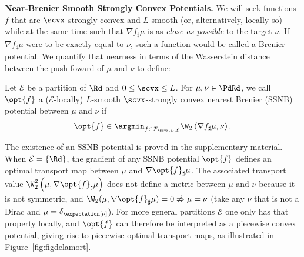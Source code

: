 \textbf{Near-Brenier Smooth Strongly Convex Potentials.}
We will seek functions $f$ that are $\scvx$-strongly convex and $L$-smooth (or, alternatively, locally so) while at the same time such that $\nabla f_\sharp \mu$ is as \textit{close as possible} to the target $\nu$. If $\nabla f_\sharp \mu$ were to be exactly equal to $\nu$, such a function would be called a Brenier potential. We quantify that nearness in terms of the Wasserstein distance between the push-foward of $\mu$ and $\nu$ to define:

\begin{definition} \label{def:SSNB}
    Let $\mathcal{E}$ be a partition of $\Rd$ and $0 \leq \scvx \leq L$. For $\mu, \nu \in \PdRd$, we call $\opt{f}$ a ($\mathcal{E}$-locally) $L$-smooth $\scvx$-strongly convex nearest Brenier (SSNB) potential between $\mu$ and $\nu$ if
    \[
        \opt{f} \in \argmin_{f \in \mathcal{F}_{\scvx, L,\mathcal{E}}} \W_2\left(\nabla f_\sharp\mu, \nu\right).
    \]
\end{definition}


\begin{remark}
    The existence of an SSNB potential is proved in the supplementary material. When $\mathcal{E}=\{\Rd\}$, the gradient of any SSNB potential $\opt{f}$ defines an optimal transport map between $\mu$ and ${\nabla \opt{f}}_\sharp\mu$. The associated transport value $\W_2^2\left(\mu, {\nabla \opt{f}}_\sharp\mu\right)$ does not define a metric between $\mu$ and $\nu$ because it is not symmetric, and $\W_2(\mu, {\nabla \opt{f}}_\sharp\mu)=0 \not \Rightarrow \mu=\nu$ (take any $\nu$ that is not a Dirac and $\mu = \delta_{\expectation[\nu]}$).
    For more general partitions $\mathcal{E}$ one only has that property locally, and $\opt{f}$ can therefore be interpreted as a piecewise convex potential, giving rise to piecewise optimal transport maps, as illustrated in Figure~\ref{fig:figdelamort}.
\end{remark}

